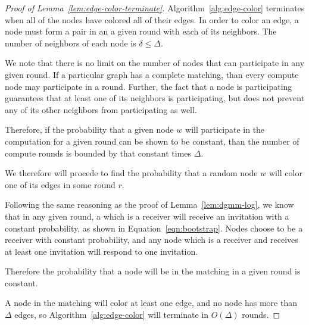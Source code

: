 \begin{proof}[Proof of Lemma~\ref{lem:edge-color-terminate}]

Algorithm~\ref{alg:edge-color} terminates when all of the nodes have colored all of their edges. In order to color an edge, a node must form a pair in an a given round with each of its neighbors. The number of neighbors of each node is $\delta \le \Delta$.

We note that there is no limit on the number of nodes that can participate in any given round. If a particular graph has a complete matching, than every compute node may participate in a round. Further, the fact that a node is participating guarantees that at least one of its neighbors is participating, but does not prevent any of its other neighbors from participating as well.

Therefore, if the probability that a given node $w$ will participate in the computation for a given round can be shown to be constant, than the number of compute rounds is bounded by that constant times $\Delta$.

We therefore will procede to find the probability that a random node $w$ will color one of its edges in some round $r$.

Following the same reasoning as the proof of Lemma~\ref{lem:dgmm-log}, we know that in any given round, a which is a receiver will receive an invitation with a constant probability, as shown in Equation~\ref{eqn:bootstrap}. Nodes choose to be a receiver with constant probability, and any node which is a receiver and receives at least one invitation will respond to one invitation.

Therefore the probability that a node will be in the matching in a given round is constant.

A node in the matching will color at least one edge, and no node has more than $\Delta$ edges, so Algorithm~\ref{alg:edge-color} will terminate in $O(\Delta)$ rounds.

\end{proof}
